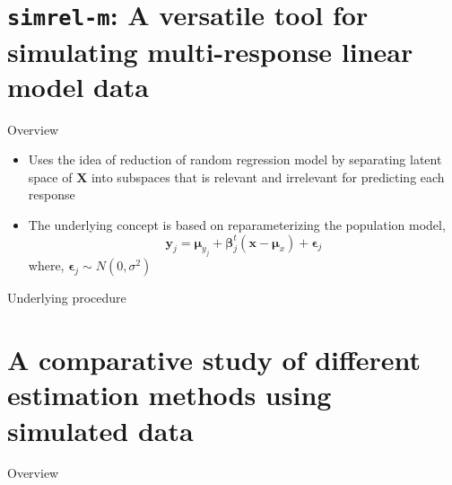 \documentclass[ignorenonframetext,]{beamer}
\providecommand{\tightlist}{%
  \setlength{\itemsep}{0pt}\setlength{\parskip}{0pt}}
\begin{document}
\section{\texorpdfstring{\texttt{simrel-m}: A versatile tool for
simulating multi-response linear model
data}{simrel-m: A versatile tool for simulating multi-response linear model data}}\label{simrel-m-a-versatile-tool-for-simulating-multi-response-linear-model-data}

\begin{frame}{Overview}

\begin{itemize}[<+->]
\tightlist
\item
  Uses the idea of reduction of random regression model by separating
  latent space of \(\mathbf{X}\) into subspaces that is relevant and
  irrelevant for predicting each response
\item
  The underlying concept is based on reparameterizing the population
  model,
  \[\mathbf{y}_j = \boldsymbol{\mu}_{y_j} + \boldsymbol{\beta}_j^t\left(\mathbf{x} - \boldsymbol{\mu}_x\right) + \boldsymbol{\epsilon}_j\]
  where, \(\boldsymbol{\epsilon}_j \sim N(0, \sigma^2)\)
\end{itemize}

\end{frame}

\begin{frame}{Underlying procedure}

\hypertarget{left}{}

\hypertarget{rightux5ctextgreaterux7bux7duxauxaux5ctextlessux7bux7dux2fdivux5ctextgreaterux7bux7duxauxaux5cux23ux20Aux20comparativeux20studyux20ofux20differentux20estimationux20methodsux20usingux20simulatedux20datauxaux5cux23ux5cux23ux20Overviewuxauxa----uxauxaux5cux23ux20Conclusionuxauxaux5cux23ux5cux23ux20Testinguxaux5ctextlessux7bux7dpux20class=}{}

\end{frame}

\section{A comparative study of different estimation methods using
simulated
data}\label{a-comparative-study-of-different-estimation-methods-using-simulated-data}

\begin{frame}{Overview}

\end{frame}
\end{document}

